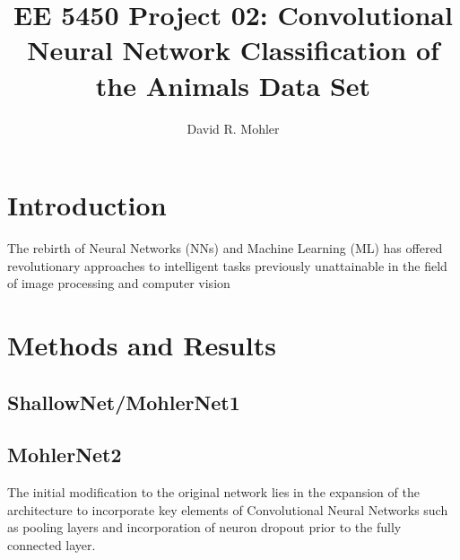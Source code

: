\documentclass[12pt]{article}
\begin{document}
\title{EE 5450  Project 02: Convolutional Neural Network Classification of the Animals Data Set}

\author{David R. Mohler}


\maketitle

\section{Introduction} 
The rebirth of Neural Networks (NNs) and Machine Learning (ML) has offered revolutionary approaches to intelligent tasks previously unattainable in the field of image processing and computer vision 

\section{Methods and Results}


\subsection{ShallowNet/MohlerNet1}

\subsection{MohlerNet2}
The initial modification to the original network lies in the expansion of the architecture to incorporate key elements of Convolutional Neural Networks such as pooling layers and incorporation of neuron dropout prior to the fully connected layer. 
\end{document}
